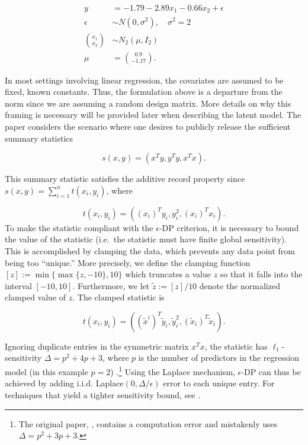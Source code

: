 \begin{equation*}
\begin{aligned}
y &= -1.79 -2.89x_1 -0.66x_2 + \epsilon\\
\epsilon &\sim N(0,\sigma^2), \quad \sigma^2 = 2\\
\binom{x_1}{x_2} &\sim N_{2}(\mu, I_2)\\
\mu &= \binom{0.9}{-1.17}.
\end{aligned}
\end{equation*}

In most settings involving linear regression, the covariates are assumed to be
fixed, known constants. Thus, the formulation above is a departure from the norm since
we are assuming a random design matrix. More details on why this framing is necessary
will be provided later when describing the latent model. The paper considers the scenario where one desires to publicly release the
sufficient summary statistics

\begin{equation*}
s(x,y) = (x^Ty, y^Ty, x^Tx).
\end{equation*}

This summary statistic satisfies the additive record property since \(s(x,y) = \sum_{i=1}^{n} t(x_i, y_i)\),
where

\begin{equation*}
t(x_i,y_i) = ((x_{i})^T y_i, y_i^2, (x_{i})^T x_i).
\end{equation*}
To make the statistic compliant with
the \(\epsilon\)-DP criterion, it is
necessary to bound the value of the statistic
(i.e.~the statistic must have finite global sensitivity). This is accomplished
by clamping the data, which prevents any data point from being too ``unique.''
More precisely, we define
the clamping function \([z] := \min\{\max\{z,-10\}, 10\}\) which truncates a value
\(z\) so that it falls into the interval \([-10,10]\). Furthermore, we let \(\tilde{z} := [z]/10\)
denote the normalized clamped value of \(z\). The clamped statistic is

\begin{equation*}
t(x_i,y_i) = ((\tilde{x}^{i})^T \tilde{y}_i, \tilde{y}_i^2, (\tilde{x}_{i})^T \tilde{x}_i).
\end{equation*}

Ignoring duplicate entries in the symmetric matrix \(x^Tx\), the statistic has \(\ell_1\)-sensitivity \(\Delta = p^2 + 4p + 3\),
where \(p\) is the number of predictors in the regression model (in this example \(p = 2\))
.\footnote{The original paper, \citet{Ju2022}, contains a computation error and mistakenly uses \(\Delta = p^2 + 3p + 3\).}
Using the Laplace mechanism, \(\epsilon\)-DP can thus be achieved by adding i.i.d. Laplace\((0, \Delta/\epsilon)\)
error to each unique entry. For techniques that yield a tighter sensitivity bound,
see \citet{Awan2021}.

